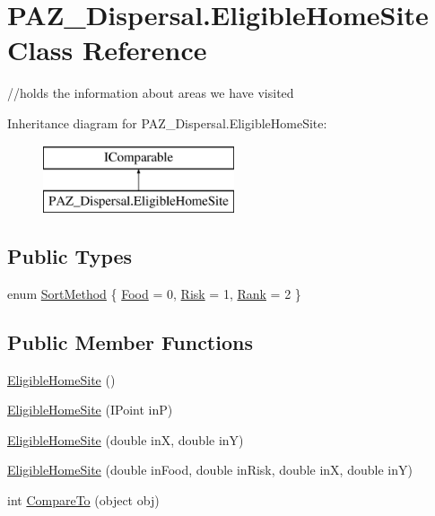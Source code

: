 \hypertarget{class_p_a_z___dispersal_1_1_eligible_home_site}{\section{P\-A\-Z\-\_\-\-Dispersal.\-Eligible\-Home\-Site Class Reference}
\label{class_p_a_z___dispersal_1_1_eligible_home_site}
}


//holds the information about areas we have visited  


Inheritance diagram for P\-A\-Z\-\_\-\-Dispersal.\-Eligible\-Home\-Site\-:\begin{figure}[H]
\begin{center}
\leavevmode
\includegraphics[height=2.000000cm]{class_p_a_z___dispersal_1_1_eligible_home_site}
\end{center}
\end{figure}
\subsection*{Public Types}
\begin{DoxyCompactItemize}
\item 
enum \hyperlink{class_p_a_z___dispersal_1_1_eligible_home_site_a932acc387cf74015c8ca583f18c598dd}{Sort\-Method} \{ \hyperlink{class_p_a_z___dispersal_1_1_eligible_home_site_a932acc387cf74015c8ca583f18c598dda0a38e7286ebbb560354992b3ce62be67}{Food} = 0, 
\hyperlink{class_p_a_z___dispersal_1_1_eligible_home_site_a932acc387cf74015c8ca583f18c598dda59ca88f7b0e80cdd9af330af600a9ff6}{Risk} = 1, 
\hyperlink{class_p_a_z___dispersal_1_1_eligible_home_site_a932acc387cf74015c8ca583f18c598dda021da1b20f73dc252361a54d80497ef3}{Rank} = 2
 \}
\end{DoxyCompactItemize}
\subsection*{Public Member Functions}
\begin{DoxyCompactItemize}
\item 
\hyperlink{class_p_a_z___dispersal_1_1_eligible_home_site_ab0d53b950acccb4e5c8af00074a25b9c}{Eligible\-Home\-Site} ()
\item 
\hyperlink{class_p_a_z___dispersal_1_1_eligible_home_site_a3e56c9a1747db706a49f2653f7bf4198}{Eligible\-Home\-Site} (I\-Point in\-P)
\item 
\hyperlink{class_p_a_z___dispersal_1_1_eligible_home_site_aa21ca59d470974704ce0725d2fabf64a}{Eligible\-Home\-Site} (double in\-X, double in\-Y)
\item 
\hyperlink{class_p_a_z___dispersal_1_1_eligible_home_site_abad65993f675689d7c89cbd04eb3131a}{Eligible\-Home\-Site} (double in\-Food, double in\-Risk, double in\-X, double in\-Y)
\item 
int \hyperlink{class_p_a_z___dispersal_1_1_eligible_home_site_a5fc267a6149a476687711b1d625ad977}{Compare\-To} (object obj)
\end{DoxyCompactItemize}
